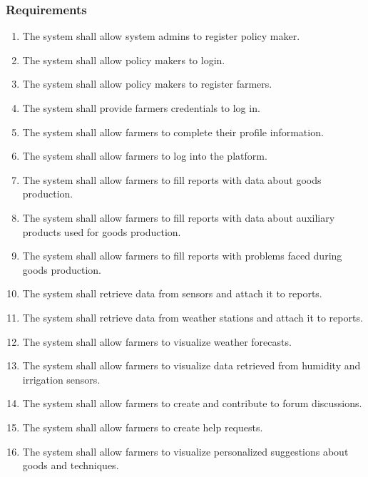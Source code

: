 \documentclass[10pt]{article}
\begin{document}
\subsubsection{Requirements}
\begin{enumerate}[label=\textbf{R\arabic*}]
    \item \label{req:pmReg} The system shall allow system admins to register policy maker.    
    \item \label{req:pmLogin} The system shall allow policy makers to login.    
    \item \label{req:farmerReg1} The system shall allow policy makers to register farmers.    
    \item \label{req:farmerCreds} The system shall provide farmers credentials to log in.    
    \item \label{req:farmerReg2} The system shall allow farmers to complete their profile information.    
    \item \label{req:farmerLogin} The system shall allow farmers to log into the platform.      
    \item \label{req:farmerReport1} The system shall allow farmers to fill reports with data about goods production.    
    \item \label{req:farmerReport2} The system shall allow farmers to fill reports with data about auxiliary products used for goods production.    
    \item \label{req:farmerReport3} The system shall allow farmers to fill reports with problems faced during goods production.     
    \item \label{req:farmerReport4} The system shall retrieve data from sensors and attach it to reports.     
    \item \label{req:farmerReport5} The system shall retrieve data from weather stations and attach it to reports.     
    \item \label{req:farmerWeather} The system shall allow farmers to visualize weather forecasts.
    \item \label{req:farmerSensors} The system shall allow farmers to visualize data retrieved from humidity and irrigation sensors.
    \item \label{req:farmerForum} The system shall allow farmers to create and contribute to forum discussions.    
    \item \label{req:farmerHelp} The system shall allow farmers to create help requests.     
    \item \label{req:farmerSugg} The system shall allow farmers to visualize personalized suggestions about goods and techniques.    

\end{enumerate}
\end{document}
